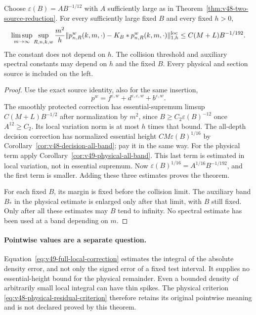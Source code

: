 \begin{theorem}
\label{thm:v49-full-local-correction}
Choose $\varepsilon(B)=A B^{-1/12}$ with $A$ sufficiently large as
in Theorem~\ref{thm:v48-two-source-reduction}. For every sufficiently
large fixed $B$ and every fixed $h>0$,
\begin{equation}\label{eq:v49-full-local-correction}
 \limsup_{m\to\infty}\sup_{R,n,k,w}
 \frac{m^2}{h}\|p^w_{n,R}(k,m,\cdot)
             -K_B*p^w_{n,R}(k,m,\cdot)\|_{1,h}^{\rm loc}
                              \le C(M+L)B^{-1/192}.
\end{equation}
The constant does not depend on $h$. The collision threshold and
auxiliary spectral constants may depend on $h$ and the fixed $B$.
Every physical and section source is included on the left.
\end{theorem}
\begin{proof}
Use the exact source identity, also for the same insertion,
\[
 p^w=f^{\varepsilon,w}
           +d^{\varepsilon,\varepsilon,w}+b^{\varepsilon,w}.
\]
The smoothly protected correction has essential-supremum limsup
$C(M+L)B^{-1/2}$ after normalization by $m^2$, since
$B\ge C_2\varepsilon(B)^{-12}$ once $A^{12}\ge C_2$.
Its local variation norm is at most $h$ times that bound.
The all-depth decision correction has normalized essential height
$CM\varepsilon(B)^{1/16}$ by
Corollary~\ref{cor:v48-decision-all-band}; pay it in the same way.
For the physical term apply Corollary~\ref{cor:v49-physical-all-band}.
This last term is estimated in local variation, not in essential
supremum. Now
$\varepsilon(B)^{1/16}=A^{1/16}B^{-1/192}$, and the first term is
smaller. Adding these three estimates proves the theorem.

For each fixed $B$, its margin is fixed before the collision limit.
The auxiliary band $B_*$ in the physical estimate is enlarged only
after that limit, with $B$ still fixed. Only after all these estimates
may $B$ tend to infinity. No spectral estimate has been used at a
band depending on $m$.
\end{proof}

\paragraph{Pointwise values are a separate question.}
Equation~\eqref{eq:v49-full-local-correction} estimates the integral
of the absolute density error, and not only the signed error of a
fixed test interval. It supplies no essential-height bound for the
physical remainder. Even a bounded density of arbitrarily small
local integral can have thin spikes. The physical criterion
\eqref{eq:v48-physical-residual-criterion} therefore retains its
original pointwise meaning and is not declared proved by this theorem.
